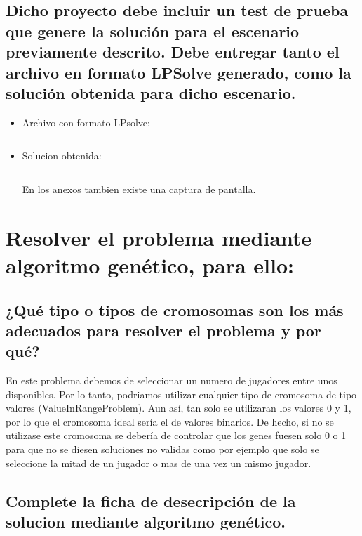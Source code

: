 \documentclass[a4paper,12pt]{article}
\begin{document}
\subsection{Dicho proyecto debe incluir un test de prueba que genere la solución para el escenario previamente descrito.
Debe entregar tanto el archivo en formato LPSolve generado, como la solución obtenida para dicho escenario.}

\begin{itemize}
  \item Archivo con formato LPsolve:
  \inputminted[fontsize=\footnotesize,breaklines]{text}{ficheros/ArchivoLPSolveGenerado.txt}
  \item Solucion obtenida:
  \inputminted[fontsize=\footnotesize,breaklines]{text}{ficheros/Solucion.txt}
  En los anexos tambien existe una captura de pantalla.

\end{itemize}




\section{Resolver el problema mediante algoritmo genético, para ello:}
\subsection{¿Qué tipo o tipos de cromosomas son los más adecuados para resolver el problema y por qué?}
En este problema debemos de seleccionar un numero de jugadores entre unos disponibles.
Por lo tanto, podriamos utilizar cualquier tipo de cromosoma de tipo valores (ValueInRangeProblem).
Aun así, tan solo se utilizaran los valores 0 y 1, por lo que el cromosoma ideal sería el de valores binarios.
De hecho, si no se utilizase este cromosoma se debería de controlar que los genes fuesen solo 0 o 1 para que no
se diesen soluciones no validas como por ejemplo que solo se seleccione la mitad de un jugador o mas de una vez un mismo jugador.
\subsection{Complete la ficha de desecripción de la solucion mediante algoritmo genético.}
\end{document}
